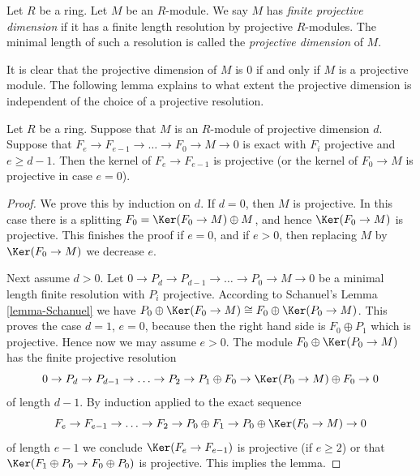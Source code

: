 \begin{definition}
\label{definition-finite-proj-dim}
Let $R$ be a ring. Let $M$ be an $R$-module. We say $M$ has
{\it finite projective dimension} if it has a finite length
resolution by projective $R$-modules. The minimal length of such a
resolution is called the {\it projective dimension}
of $M$.
\end{definition}

\noindent
It is clear that the projective dimension of $M$ is $0$ if and
only if $M$ is a projective module.
The following lemma explains to what extent the projective
dimension is independent of the choice of a projective
resolution.

\begin{lemma}
\label{lemma-independent-resolution}
Let $R$ be a ring. Suppose that $M$ is an $R$-module of projective
dimension $d$. Suppose that $F_e \to F_{e-1} \to \ldots \to F_0 \to M \to 0$
is exact with $F_i$ projective and $e \geq d - 1$.
Then the kernel of $F_e \to F_{e-1}$ is projective
(or the kernel of $F_0 \to M$ is projective in case
$e = 0$).
\end{lemma}

\begin{proof}
We prove this by induction on $d$. If $d = 0$, then
$M$ is projective. In this case there is a splitting
$F_0 = \Ker(F_0 \to M) \oplus M$, and hence
$\Ker(F_0 \to M)$ is projective. This finishes
the proof if $e = 0$, and if $e > 0$, then replacing
$M$ by $\Ker(F_0 \to M)$ we decrease $e$.

\medskip\noindent
Next assume $d > 0$.
Let $0 \to P_d \to P_{d-1} \to \ldots \to P_0 \to M \to 0$
be a minimal length finite resolution with $P_i$ projective.
According to
Schanuel's Lemma \ref{lemma-Schanuel}
we have
$P_0 \oplus \Ker(F_0 \to M) \cong F_0 \oplus \Ker(P_0 \to M)$.
This proves the case $d = 1$, $e = 0$, because then the right
hand side is $F_0 \oplus P_1$ which is projective. Hence now we may
assume $e > 0$. The module $F_0 \oplus \Ker(P_0 \to M)$ has the
finite projective resolution
$$
0 \to P_d \to P_{d-1} \to \ldots \to
P_2 \to P_1 \oplus F_0 \to \Ker(P_0 \to M) \oplus F_0 \to 0
$$
of length $d - 1$. By induction applied to the exact sequence
$$
F_e \to F_{e-1} \to \ldots \to F_2 \to P_0 \oplus F_1 \to
P_0 \oplus \Ker(F_0 \to M) \to 0
$$
of length $e - 1$ we conclude $\Ker(F_e \to F_{e - 1})$
is projective (if $e \geq 2$)
or that $\Ker(F_1 \oplus P_0 \to F_0 \oplus P_0)$ is projective.
This implies the lemma.
\end{proof}

